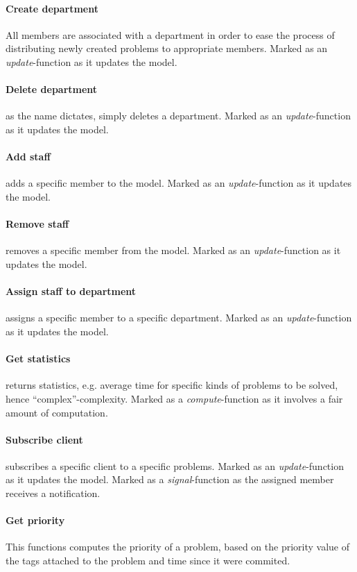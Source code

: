 
\paragraph{Create department} All \astaff[] members are associated with a department in order to ease the process of distributing newly created problems to appropriate \astaff[] members. Marked as an \textit{update}-function as it updates the model. 

\paragraph{Delete department} as the name dictates, simply deletes a department. Marked as an \textit{update}-function as it updates the model. 

\paragraph{Add staff} adds a specific \astaff[] member to the model. Marked as an \textit{update}-function as it updates the model. 

\paragraph{Remove staff} removes a specific \astaff[] member from the model. Marked as an \textit{update}-function as it updates the model. 

\paragraph{Assign staff to department} assigns a specific \astaff[] member to a specific department. Marked as an \textit{update}-function as it updates the model. 

\paragraph{Get statistics} returns statistics, e.g. average time for specific kinds of problems to be solved, hence ``complex''-complexity. Marked as a \textit{compute}-function as it involves a fair amount of computation.
\paragraph{Subscribe client} subscribes a specific client to a specific problems. Marked as an \textit{update}-function as it updates the model. Marked as a \textit{signal}-function as the assigned \astaff[] member receives a notification. 

\paragraph{Get priority} This functions computes the priority of a problem, based on the priority value of the tags attached to the problem and time since it were commited. 